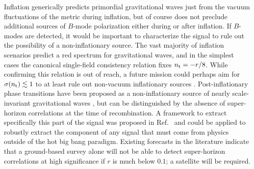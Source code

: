 Inflation generically predicts primordial gravitational waves just from the vacuum fluctuations of the metric during inflation, but of course does not preclude additional sources of $B$-mode polarization either during or after inflation. If $B$-modes are detected, it would be important to characterize the signal to rule out the possibility of a non-inflationary source. 
The vast majority of inflation scenarios predict a red spectrum for gravitational waves, and in the simplest cases the canonical single-field consistency relation fixes $n_{\rm t}=-r/8$. While confirming this relation is out of reach, a future mission could perhaps aim for $\sigma(n_{\rm t})\lesssim1$ to at least rule out non-vacuum inflationary sources  \cite{Namba:2015gja,Peloso:2016gqs}. Post-inflationary phase transitions have been proposed as a non-inflationary source of nearly scale-invariant gravitational waves \cite{Krauss:1991qu,JonesSmith:2007ne,Giblin:2011yh,Figueroa:2012kw,Fenu:2013tea}, but can be distinguished by the absence of super-horizon correlations at the time of recombination. A framework to extract specifically this part of the signal was proposed in Ref.~\cite{Baumann:2009mq} and could be applied to robustly extract the component of any signal that must come from physics outside of the hot big bang paradigm. Existing forecasts in the literature \cite{Lee:2014cya} indicate that a ground-based survey alone will not be able to detect super-horizon correlations at high significance if $r$ is much below $0.1$; a satellite will be required.

